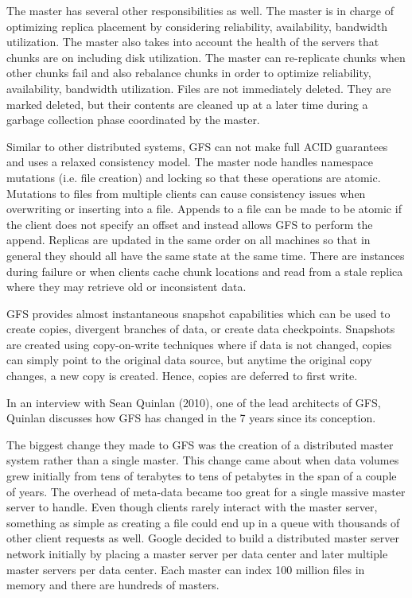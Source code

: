 \documentclass[]{article}
\begin{document}
The master has several other responsibilities as well. The master is in charge of optimizing replica placement by considering reliability, availability, bandwidth utilization. The master also takes into account the health of the servers that chunks are on including disk utilization. The master can re-replicate chunks when other chunks fail and also rebalance chunks in order to optimize reliability, availability, bandwidth utilization. Files are not immediately deleted. They are marked deleted, but their contents are cleaned up at a later time during a garbage collection phase coordinated by the master.

Similar to other distributed systems, GFS can not make full ACID guarantees and uses a relaxed consistency model. The master node handles namespace mutations (i.e. file creation) and locking so that these operations are atomic. Mutations to files from multiple clients can cause consistency issues when overwriting or inserting into a file. Appends to a file can be made to be atomic if the client does not specify an offset and instead allows GFS to perform the append. Replicas are updated in the same order on all machines so that in general they should all have the same state at the same time. There are instances during failure or when clients cache chunk locations and read from a stale replica where they may retrieve old or inconsistent data. 

GFS provides almost instantaneous snapshot capabilities which can be used to create copies, divergent branches of data, or create data checkpoints. Snapshots are created using copy-on-write techniques where if data is not changed, copies can simply point to the original data source, but anytime the original copy changes, a new copy is created. Hence, copies are deferred to first write. 

In an interview with Sean Quinlan\cite{mckusick_gfs:_2010} (2010), one of the lead architects of GFS, Quinlan discusses how GFS has changed in the 7 years since its conception. 

The biggest change they made to GFS was the creation of a distributed master system rather than a single master. This change came about when data volumes grew initially from tens of terabytes to tens of petabytes in the span of a couple of years. The overhead of meta-data became too great for a single massive master server to handle. Even though clients rarely interact with the master server, something as simple as creating a file could end up in a queue with thousands of other client requests as well. Google decided to build a distributed master server network initially by placing a master server per data center and later multiple master servers per data center. Each master can index 100 million files in memory and there are hundreds of masters.
\end{document}
